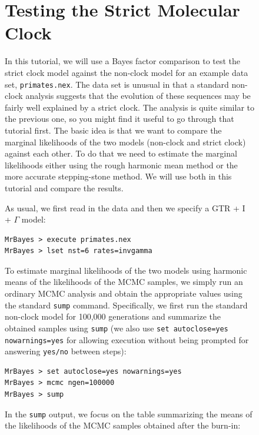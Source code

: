 \documentclass[12pt]{book}
\newcommand{\ttt}[1]{\texttt{#1}}
\begin{document}
\begin{figure}[h]
\section{Testing the Strict Molecular Clock}
\label{strictClock}

In this tutorial, we will use a Bayes factor comparison to test the strict clock model against the
non-clock model for an example data set, \texttt{primates.nex}. The data set is unusual in that a
standard non-clock analysis suggests that the evolution of these sequences may be fairly well
explained by a strict clock. The analysis is quite similar to the previous one, so you might find
it useful to go through that tutorial first. The basic idea is that we want to compare the marginal
likelihoods of the two models (non-clock and strict clock) against each other. To do that we need
to estimate the marginal likelihoods either using the rough harmonic mean method or the more
accurate stepping-stone method. We will use both in this tutorial and compare the results.

As usual, we first read in the data and then we specify a GTR + I + $\Gamma$ model:

\begin{singlespacing}\small
\begin{verbatim}
MrBayes > execute primates.nex
MrBayes > lset nst=6 rates=invgamma
\end{verbatim}
\end{singlespacing}
\normalsize

To estimate marginal likelihoods of the two models using harmonic means of the likelihoods of the
MCMC samples, we simply run an ordinary MCMC analysis and obtain the appropriate values using the
standard \texttt{sump} command. Specifically, we first run the standard non-clock model for 100,000
generations and summarize the obtained samples using \texttt{sump} (we also use \ttt{set autoclose=yes
nowarnings=yes} for allowing execution without being prompted for answering \texttt{yes/no}
between steps):

\begin{singlespacing}\small
\begin{verbatim}
MrBayes > set autoclose=yes nowarnings=yes
MrBayes > mcmc ngen=100000
MrBayes > sump
\end{verbatim}
\end{singlespacing}
\normalsize

In the \texttt{sump} output, we focus on the table summarizing the means of the likelihoods of the
MCMC samples obtained after the burn-in:


\end{figure}
\end{document}
